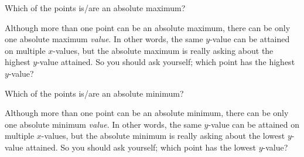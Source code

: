\documentclass{ximera}
\begin{document}
\begin{problem}
\begin{problem}
        \begin{problem}
            Which of the points is/are an absolute maximum?
            \begin{selectAll}
            \end{selectAll}
            \begin{feedback}
                Although more than one point can be an absolute maximum, there can be only one absolute maximum \textit{value}. In other words, the same $y$-value can be attained on multiple $x$-values, but the absolute maximum is really asking about the highest $y$-value attained. So you should ask yourself; which point has the highest $y$-value?
            \end{feedback}
            
            \begin{problem}
                Which of the points is/are an absolute minimum?
                \begin{selectAll}
                \end{selectAll}
                \begin{feedback}
                    Although more than one point can be an absolute minimum, there can be only one absolute minimum \textit{value}. In other words, the same $y$-value can be attained on multiple $x$-values, but the absolute minimum is really asking about the lowest $y$-value attained. So you should ask yourself; which point has the lowest $y$-value?
                \end{feedback}
            \end{problem}
        \end{problem}
    \end{problem}
\end{problem}
\end{document}
